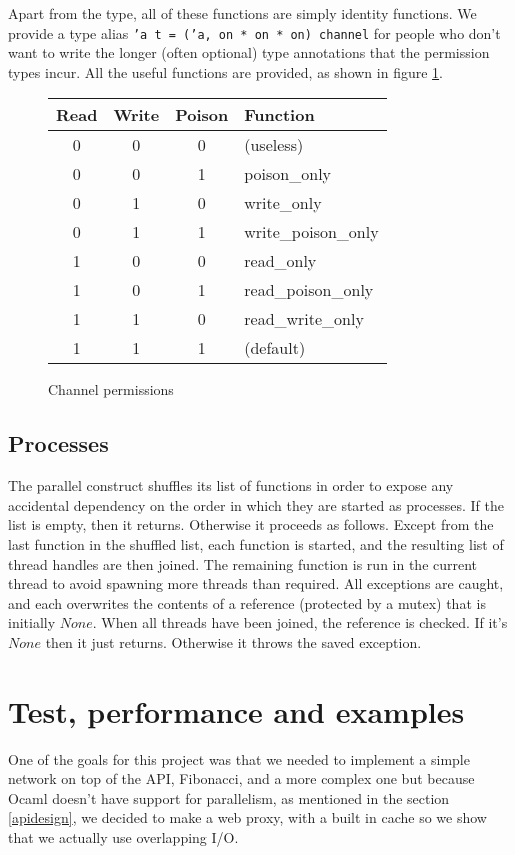 \documentclass[a4paper,12pt]{article}
\begin{document}
Apart from the type, all of these functions are simply identity functions. We provide a
type alias \texttt{'a t = ('a, on * on * on) channel} for people who don't want to write the
longer (often optional) type annotations that the permission types incur. All
the useful functions are provided, as shown in figure \ref{channel-permissions}.

\begin{figure}[h]
\centering
\begin{tabular}{c|c|c|l}
Read & Write & Poison & Function \\
\hline
0 & 0 & 0 & (useless) \\
0 & 0 & 1 & poison\_only \\
0 & 1 & 0 & write\_only \\
0 & 1 & 1 & write\_poison\_only \\
1 & 0 & 0 & read\_only \\
1 & 0 & 1 & read\_poison\_only \\
1 & 1 & 0 & read\_write\_only \\
1 & 1 & 1 & (default) \\
\end{tabular}
\caption{Channel permissions}
\label{channel-permissions}
\end{figure}

\subsection{Processes}

The parallel construct shuffles its list of functions in order to expose any
accidental dependency on the order in which they are started as processes.
If the list is empty, then it returns. Otherwise it proceeds as follows.
Except from the last function in the shuffled list, each function is started,
and the resulting list of thread handles are then joined. The remaining
function is run in the current thread to avoid spawning more threads than
required. All exceptions are caught, and each overwrites the contents of a
reference (protected by a mutex) that is initially $None$. When all threads have
been joined, the reference is checked. If it's $None$ then it just returns.
Otherwise it throws the saved exception.

\section{Test, performance and examples}
\label{testexamples}
One of the goals for this project was that we needed to implement a simple
network on top of the API, Fibonacci, and a more complex one but because Ocaml
doesn't have support for parallelism, as mentioned in the section \ref{apidesign},
we decided to make a web proxy, with a built in cache so we show that we actually
use overlapping I/O.
\end{document}
